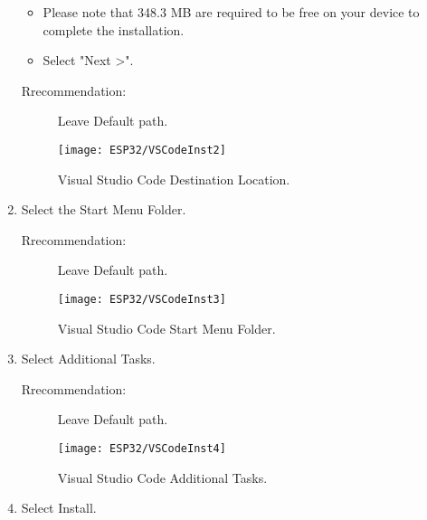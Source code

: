 \begin{enumerate}
    \begin{itemize}
        \item Please note that 348.3 MB are required to be free on your device to complete the installation.
        \item Select "Next >".
    \end{itemize}
    \begin{description}
        \item[Rrecommendation: ] Leave Default path.
    \end{description}
    \begin{figure}  [H]
        \begin{center}
            \texttt{[image: ESP32/VSCodeInst2]}
            \caption{Visual Studio Code Destination Location.} 
            \label{fig:Visual Studio Code Destination Location.}
        \end{center}
    \end{figure}
    \item Select the Start Menu Folder.
    \begin{description}
        \item[Rrecommendation: ] Leave Default path.
    \end{description}
    \begin{figure}  [H]
        \begin{center}
            \texttt{[image: ESP32/VSCodeInst3]}
            \caption{Visual Studio Code Start Menu Folder.} 
            \label{fig:Visual Studio Code Start Menu Folder.}
        \end{center}
    \end{figure}
    \item Select Additional Tasks.
    \begin{description}
        \item[Rrecommendation: ] Leave Default path.
    \end{description}
    \begin{figure}  [H]
        \begin{center}
            \texttt{[image: ESP32/VSCodeInst4]}
            \caption{Visual Studio Code Additional Tasks.} 
            \label{fig:Visual Studio Code Additional Tasks.}
        \end{center}
    \end{figure}
    \item Select Install.
    \begin{figure}  [H]
        \begin{center}

\end{center}
\end{figure}
\end{enumerate}
